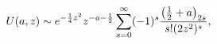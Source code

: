 \[\mathop{U\/}\nolimits\!\left(a,z\right)\sim e^{-\frac{1}{4}z^{2}}z^{-a-\frac{1%
}{2}}\sum_{s=0}^{\infty}(-1)^{s}\frac{\left(\frac{1}{2}+a\right)_{2s}}{s!(2z^{%
2})^{s}},\]